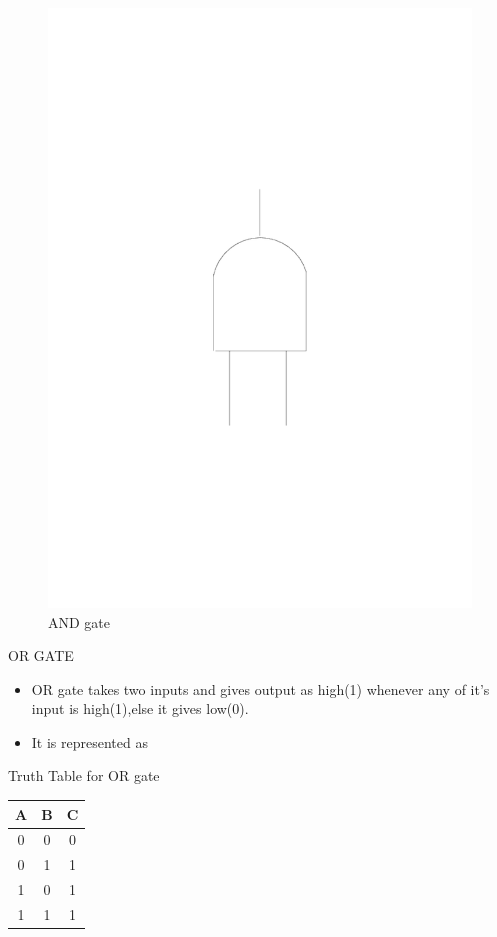 \documentclass{beamer}
\begin{document}
\begin{frame}
\begin{figure}
\includegraphics[scale=0.2]{../beamer_bib/and.pdf} 
\caption{AND gate}
\end{figure}
\end{frame}
\begin{frame}[label=OR]{OR GATE}
\begin{block}{}
\begin{itemize}
  \item OR gate takes two inputs and gives output as high(1) whenever any of it's input is high(1),else it gives low(0).
  \item It is represented as 
\end{itemize}
\end{block}
\medskip
\medskip
\pause
\begin{block}{Truth Table for OR gate}
\begin{tabular}{|c|c||c|}
\hline
 \textbf{A} &
\textbf{B} & \textbf{C} \\
\hline
\hline
 0 & 0 & 0 \\
\hline
 0 & 1 & 1 \\
\hline
 1 & 0 & 1 \\
\hline
 1 & 1 & 1 \\
\hline
\end{tabular}
\end{block}
\end{frame}
\end{document}
